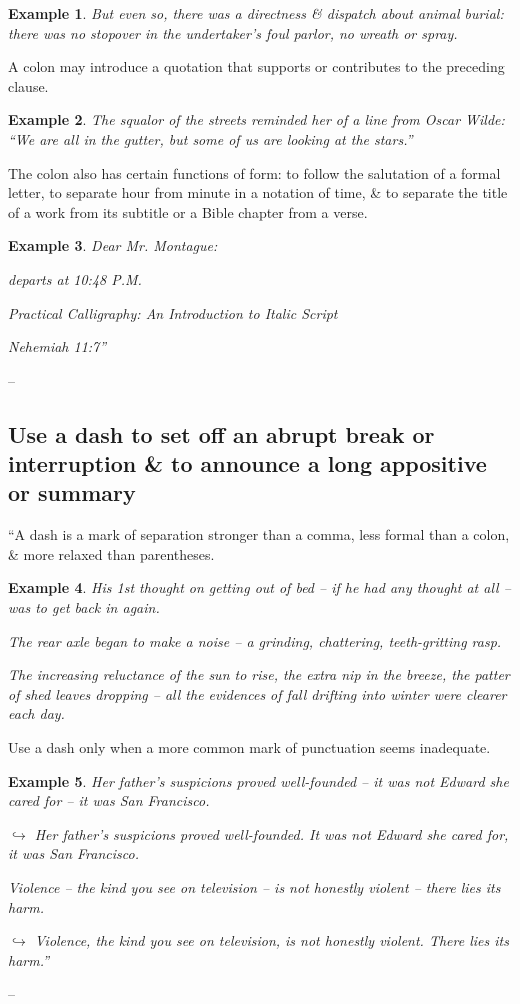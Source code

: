 \documentclass[oneside]{book}
\numberwithin{equation}{section}
\newtheorem{example}{Example}[chapter]
\begin{document}
\begin{example}
	But even so, there was a directness \& dispatch about animal burial: there was no stopover in the undertaker's foul parlor, no wreath or spray.
\end{example}
A colon may introduce a quotation that supports or contributes to the preceding clause.

\begin{example}
	The squalor of the streets reminded her of a line from Oscar Wilde: ``We are all in the gutter, but some of us are looking at the stars.''
\end{example}
The colon also has certain functions of form: to follow the salutation of a formal letter, to separate hour from minute in a notation of time, \& to separate the title of a work from its subtitle or a Bible chapter from a verse.

\begin{example}
	Dear Mr. Montague:
	
	departs at 10:48 P.M.
	
	Practical Calligraphy: An Introduction to Italic Script
	
	Nehemiah 11:7''
\end{example}
-- \cite[Chap. 1, Sect. 7, p. 21]{Strunk_White2019}

\subsection{Use a dash to set off an abrupt break or interruption \& to announce a long appositive or summary}
``A dash is a mark of separation stronger than a comma, less formal than a colon, \& more relaxed than parentheses.

\begin{example}
	His 1st thought on getting out of bed -- if he had any thought at all -- was to get back in again.
	
	The rear axle began to make a noise -- a grinding, chattering, teeth-gritting rasp.
	
	The increasing reluctance of the sun to rise, the extra nip in the breeze, the patter of shed leaves dropping -- all the evidences of fall drifting into winter were clearer each day.
\end{example}
Use a dash only when a more common mark of punctuation seems inadequate.

\begin{example}
	Her father's suspicions proved well-founded -- it was not Edward she cared for -- it was San Francisco.
	
	$\hookrightarrow$ Her father's suspicions proved well-founded. It was not Edward she cared for, it was San Francisco.
	
	Violence -- the kind you see on television -- is not honestly violent -- there lies its harm.
	
	$\hookrightarrow$ Violence, the kind you see on television, is not honestly violent. There lies its harm.''
\end{example}
-- \cite[Chap. 1, Sect. 8, p. 22]{Strunk_White2019}
\end{document}
